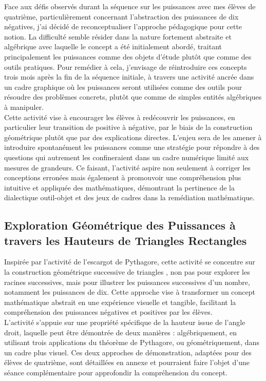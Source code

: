 Face aux défis observés durant la séquence sur les puissances avec mes élèves de quatrième,
particulièrement concernant l'abstraction des puissances de dix négatives,
j'ai décidé de reconceptualiser l'approche pédagogique pour cette notion.
La difficulté semble résider dans la nature fortement abstraite et algébrique avec laquelle le concept a été initialement abordé,
traitant principalement les puissances comme des objets d'étude plutôt que comme des outils pratiques.
Pour remédier à cela,
j'envisage de réintroduire ces concepts trois mois après la fin de la séquence initiale,
à travers une activité ancrée dans un cadre graphique où les puissances seront utilisées comme des outils pour résoudre des problèmes concrets,
plutôt que comme de simples entités algébriques à manipuler.\\

Cette activité vise à encourager les élèves à redécouvrir les puissances,
en particulier leur transition de positive à négative,
par le biais de la construction géométrique plutôt que par des explications directes.
L'enjeu sera de les amener à introduire spontanément les puissances comme une stratégie pour répondre à des questions qui autrement les confineraient dans un cadre numérique limité aux mesures de grandeurs.
Ce faisant,
l'activité aspire non seulement à corriger les conceptions erronées mais également à promouvoir une compréhension plus intuitive et appliquée des mathématiques,
démontrant la pertinence de la dialectique outil-objet et des jeux de cadres dans la remédiation mathématique.

\subsection{Exploration Géométrique des Puissances à travers les Hauteurs de Triangles Rectangles}

Inspirée par l'activité de l'escargot de Pythagore,
cette activité se concentre sur la construction géométrique successive de triangles \cite{villemin},
non pas pour explorer les racines successives,
mais pour illustrer les puissances successives d'un nombre,
notamment les puissances de dix.
Cette approche vise à transformer un concept mathématique abstrait en une expérience visuelle et tangible,
facilitant la compréhension des puissances négatives et positives par les élèves.\\

L'activité s'appuie sur une propriété spécifique de la hauteur issue de l'angle
droit, laquelle peut être démontrée de deux manières : algébriquement, en
utilisant trois applications du théorème de Pythagore, ou géométriquement, dans
un cadre plus visuel. Ces deux approches de démonstration, adaptées pour des
élèves de quatrième, sont détaillées en annexe et pourraient faire l'objet d'une
séance complémentaire pour approfondir la compréhension du concept.


